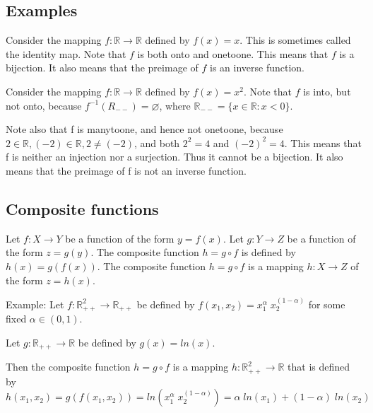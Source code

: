 \documentclass[letterpaper,10pt,english]{jupyterBook}
\begin{document}
\subsection{Examples}
\label{\detokenize{03.mappings_functions_correspondences:examples}}
\sphinxAtStartPar
Consider the mapping \(f: \mathbb{R} \rightarrow \mathbb{R}\) defined by \(f(x) = x\). This is sometimes called the identity map. Note that \(f\) is both onto and one\sphinxhyphen{}to\sphinxhyphen{}one. This means that \(f\) is a bijection. It also means that the pre\sphinxhyphen{}image of \(f\) is an inverse function.

\sphinxAtStartPar
Consider the mapping \(f: \mathbb{R} \rightarrow \mathbb{R}\) defined by \(f(x) = x^2\). Note that \(f\) is into, but not onto, because \(f^{−1}(R_{−−}) = \varnothing\), where \(\mathbb{R}_{−−} = \{x \in \mathbb{R} : x < 0\}\).

\sphinxAtStartPar
Note also that f is many\sphinxhyphen{}to\sphinxhyphen{}one, and hence not one\sphinxhyphen{}to\sphinxhyphen{}one, because \(2 \in \mathbb{R}, (−2) \in \mathbb{R}, 2 \ne (−2)\), and both \(2^2 = 4\) and \((−2)^2 = 4\).
This means that f is neither an injection nor a surjection. Thus it cannot be a bijection. It also means that the pre\sphinxhyphen{}image of f is not an inverse function.


\subsection{Composite functions}
\label{\detokenize{03.mappings_functions_correspondences:composite-functions}}
\sphinxAtStartPar
Let \(f : X \rightarrow Y\) be a function of the form \(y = f(x)\).
Let \(g : Y \rightarrow Z\) be a function of the form \(z = g(y)\).
The composite function \(h = g \circ f\) is defined by \(h(x) = g(f(x))\).
The composite function \(h = g \circ f\) is a mapping \(h : X \rightarrow Z\) of the
form \(z = h(x)\).

\sphinxAtStartPar
Example:
Let \(f : \mathbb{R}^2_{++} \rightarrow \mathbb{R}_{++}\) be defined by
\(f(x_1, x_2) = x_1^\alpha \; x_2^{(1 − \alpha)}\)
for some fixed \(\alpha \in (0, 1)\).

\sphinxAtStartPar
Let \(g : \mathbb{R}_{++} \rightarrow \mathbb{R}\) be defined by \(g(x) = ln(x)\).

\sphinxAtStartPar
Then the composite function \(h = g \circ f\) is a mapping \(h: \mathbb{R}^2_{++} \rightarrow \mathbb{R}\) that is defined by \(h(x_1, x_2) = g(f(x_1, x_2)) = ln(x_1^\alpha \; x_2^{(1 − \alpha)}) = \alpha \; ln(x_1) + (1 − \alpha) \; ln(x_2)\)
\end{document}
